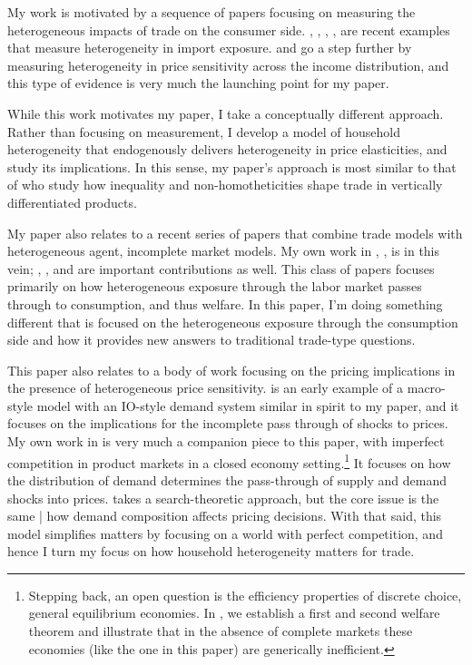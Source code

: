 \documentclass[12pt,pdftex]{article}
\begin{document}
\begin{onehalfspacing}
My work is motivated by a sequence of papers focusing on measuring the heterogeneous impacts of trade on the consumer side. \citet{fajgelbaum2016measuring}, \citet{cravino2017distributional}, \citet{carroll2020heterogeneous}, \citet{borusyak2021distributional}, \citet{jaccardtoronto} are recent examples that measure heterogeneity in import exposure. \citet{auer2022unequal} and \citet{colicev2022impact} go a step further by measuring heterogeneity in price sensitivity across the income distribution, and this type of evidence is very much the launching point for my paper.

While this work motivates my paper, I take a conceptually different approach. Rather than focusing on measurement, I develop a model of household heterogeneity that endogenously delivers heterogeneity in price elasticities, and study its implications. In this sense, my paper's approach is most similar to that of \citet{fajgelbaum2011income} who study how inequality and non-homotheticities shape trade in vertically differentiated products.

My paper also relates to a recent series of papers that combine trade models with heterogeneous agent, incomplete market models. My own work in \citet{lyon2018redistributing}, \citet{lyon2019}, \citet{waugh_consumption} is in this vein; \citet{gaston2018}, \citet{carroll2020heterogeneous}, and \citet{dvorkin2023heterogeneous} are important contributions as well. This class of papers focuses primarily on how heterogeneous exposure through the labor market passes through to consumption, and thus welfare. In this paper, I'm doing something different that is focused on the heterogeneous exposure through the consumption side and how it provides new answers to traditional trade-type questions.

This paper also relates to a body of work focusing on the pricing implications in the presence of heterogeneous price sensitivity. \citet{nakamura2010accounting} is an early example of a macro-style model with an IO-style demand system similar in spirit to my paper, and it focuses on the implications for the incomplete pass through of shocks to prices. My own work in \citet{p-iq} is very much a companion piece to this paper, with imperfect competition in product markets in a closed economy setting.\footnote{Stepping back, an open question is the efficiency properties of discrete choice, general equilibrium economies. In \citet{mongey-waugh-2}, we establish a first and second welfare theorem and illustrate that in the absence of complete markets these economies (like the one in this paper) are generically inefficient.} It focuses on how the distribution of demand determines the pass-through of supply and demand shocks into prices.  \citet{nord2022shopping} takes a search-theoretic approach, but the core issue is the same | how demand composition affects pricing decisions. With that said, this model simplifies matters by focusing on a world with perfect competition, and hence I turn my focus on how household heterogeneity matters for trade.


\end{onehalfspacing}
\end{document}
